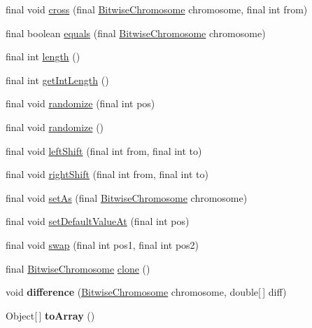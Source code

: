 \begin{CompactItemize}
\item 
final void \hyperlink{classjenes_1_1chromosome_1_1_bitwise_chromosome_933b1991999fa3b586c1739744751725}{cross} (final \hyperlink{classjenes_1_1chromosome_1_1_bitwise_chromosome}{BitwiseChromosome} chromosome, final int from)
\item 
final boolean \hyperlink{classjenes_1_1chromosome_1_1_bitwise_chromosome_41c9858f7ef05194011d1e227fea3584}{equals} (final \hyperlink{classjenes_1_1chromosome_1_1_bitwise_chromosome}{BitwiseChromosome} chromosome)
\item 
final int \hyperlink{classjenes_1_1chromosome_1_1_bitwise_chromosome_0da8899c89f8b1f222526acf1d2e8519}{length} ()
\item 
final int \hyperlink{classjenes_1_1chromosome_1_1_bitwise_chromosome_5878e8d0ace81cfb617f75109c02855d}{getIntLength} ()
\item 
final void \hyperlink{classjenes_1_1chromosome_1_1_bitwise_chromosome_1a79d4c9c671d2f735d57d64c59dfdb8}{randomize} (final int pos)
\item 
final void \hyperlink{classjenes_1_1chromosome_1_1_bitwise_chromosome_8028fde93528b7b51313f6c311b2b640}{randomize} ()
\item 
final void \hyperlink{classjenes_1_1chromosome_1_1_bitwise_chromosome_b02c791be30c931cae793289185e459f}{leftShift} (final int from, final int to)
\item 
final void \hyperlink{classjenes_1_1chromosome_1_1_bitwise_chromosome_fb689c4b268f7954214a9d0e13c6141e}{rightShift} (final int from, final int to)
\item 
final void \hyperlink{classjenes_1_1chromosome_1_1_bitwise_chromosome_a4fbad5a25ae14e9524a6ff0ec2536ca}{setAs} (final \hyperlink{classjenes_1_1chromosome_1_1_bitwise_chromosome}{BitwiseChromosome} chromosome)
\item 
final void \hyperlink{classjenes_1_1chromosome_1_1_bitwise_chromosome_e5be5fc21ff47526230a8a13ca945c08}{setDefaultValueAt} (final int pos)
\item 
final void \hyperlink{classjenes_1_1chromosome_1_1_bitwise_chromosome_fac4935f0e1d92b6b1aaf9de024e8cbb}{swap} (final int pos1, final int pos2)
\item 
final \hyperlink{classjenes_1_1chromosome_1_1_bitwise_chromosome}{BitwiseChromosome} \hyperlink{classjenes_1_1chromosome_1_1_bitwise_chromosome_2140b588068c430eaea7e9a7a5fe6b00}{clone} ()
\item 
\hypertarget{classjenes_1_1chromosome_1_1_bitwise_chromosome_33de872210289a305bc869c61a02eddb}{
void \textbf{difference} (\hyperlink{classjenes_1_1chromosome_1_1_bitwise_chromosome}{BitwiseChromosome} chromosome, double\mbox{[}$\,$\mbox{]} diff)}
\label{classjenes_1_1chromosome_1_1_bitwise_chromosome_33de872210289a305bc869c61a02eddb}

\item 
\hypertarget{classjenes_1_1chromosome_1_1_bitwise_chromosome_a191192f94ce72a631237674d81ae393}{
Object\mbox{[}$\,$\mbox{]} \textbf{toArray} ()}
\label{classjenes_1_1chromosome_1_1_bitwise_chromosome_a191192f94ce72a631237674d81ae393}

\end{CompactItemize}
